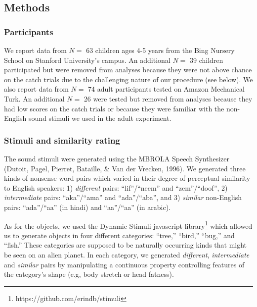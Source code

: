 \documentclass[english,,man,floatsintext]{apa6}
\let\rmarkdownfootnote\footnote%
\def\footnote{\protect\rmarkdownfootnote}
\theoremstyle{definition}
\theoremstyle{definition}
\theoremstyle{definition}
\theoremstyle{remark}
\begin{document}
\subsection{Methods}\label{methods}

\subsubsection{Participants}\label{participants}

We report data from \(N=\) 63 children ages 4-5 years from the Bing
Nursery School on Stanford University's campus. An additional \(N=\) 39
children participated but were removed from analyses because they were
not above chance on the catch trials due to the challenging nature of
our procedure (see below). We also report data from \(N=\) 74 adult
participants tested on Amazon Mechanical Turk. An additional \(N=\) 26
were tested but removed from analyses because they had low scores on the
catch trials or because they were familiar with the non-English sound
stimuli we used in the adult experiment.

\subsubsection{Stimuli and similarity
rating}\label{stimuli-and-similarity-rating}

The sound stimuli were generated using the MBROLA Speech Synthesizer
(Dutoit, Pagel, Pierret, Bataille, \& Van der Vrecken, 1996). We
generated three kinds of nonsense word pairs which varied in their
degree of perceptual similarity to English speakers: 1) \emph{different}
pairs: \enquote{lif}/\enquote{neem} and \enquote{zem}/\enquote{doof}, 2)
\emph{intermediate} pairs: \enquote{aka}/\enquote{ama} and
\enquote{ada}/\enquote{aba}, and 3) \emph{similar} non-English pairs:
\enquote{ada}/\enquote{aa} (in hindi) and
\enquote{aa}/\enquote{a\textipa{\textcrh}a} (in arabic).

As for the objects, we used the Dynamic Stimuli javascript
library\footnote{https://github.com/erindb/stimuli} which allowed us to
generate objects in four different categories: \enquote{tree,}
\enquote{bird,} \enquote{bug,} and \enquote{fish.} These categories are
supposed to be naturally occurring kinds that might be seen on an alien
planet. In each category, we generated \emph{different},
\emph{intermediate} and \emph{similar} pairs by manipulating a
continuous property controlling features of the category's shape (e.g,
body stretch or head fatness).
\end{document}
